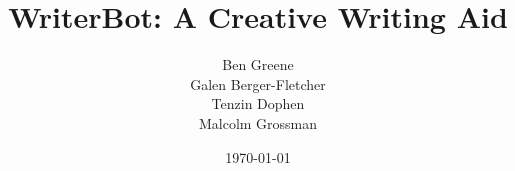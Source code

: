 \documentclass{article}
\title{WriterBot: A Creative Writing Aid}
\author{Ben Greene\\Galen Berger-Fletcher\\Tenzin Dophen\\Malcolm Grossman}
\date{\today}
\begin{document}
\maketitle















\nocite*{}


\end{document}
